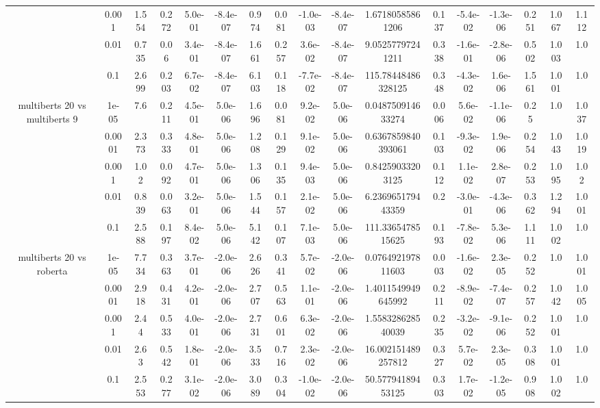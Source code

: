\begin{tabular}{|c|c|c|c|c|c|c|c|c|c|c|c|c|c|c|c|c|}
 & 0.001 & 1.554 & 0.272 & 5.0e-01 & -8.4e-07 & 0.974 & 0.081 & -1.0e-03 & -8.4e-07 & 1.67180585861206 & 0.137 & -5.4e-02 & -1.3e-06 & 0.251 & 1.067 & 1.112 \\
 & 0.01 & 0.735 & 0.06 & 3.4e-01 & -8.4e-07 & 1.661 & 0.257 & 3.6e-02 & -8.4e-07 & 9.05257797241211 & 0.338 & -1.6e-01 & -2.8e-06 & 0.502 & 1.003 & 1.0 \\
 & 0.1 & 2.699 & 0.203 & 6.7e-02 & -8.4e-07 & 6.103 & 0.118 & -7.7e-02 & -8.4e-07 & 115.78448486328125 & 0.348 & -4.3e-02 & 1.6e-06 & 1.561 & 1.001 & 1.0 \\
\hline
\multirow{5}{*}{multiberts 20 vs multiberts 9} & 1e-05 & 7.6 & 0.211 & 4.5e-01 & 5.0e-06 & 1.696 & 0.081 & 9.2e-02 & 5.0e-06 & 0.048750914633274 & 0.006 & 5.6e-02 & -1.1e-06 & 0.25 & 1.0 & 1.037 \\
 & 0.0001 & 2.373 & 0.333 & 4.8e-01 & 5.0e-06 & 1.208 & 0.129 & 9.1e-02 & 5.0e-06 & 0.6367859840393061 & 0.103 & -9.3e-02 & 1.9e-06 & 0.254 & 1.043 & 1.019 \\
 & 0.001 & 1.02 & 0.092 & 4.7e-01 & 5.0e-06 & 1.306 & 0.135 & 9.4e-03 & 5.0e-06 & 0.84259033203125 & 0.112 & 1.1e-02 & 2.8e-07 & 0.253 & 1.095 & 1.02 \\
 & 0.01 & 0.839 & 0.063 & 3.2e-01 & 5.0e-06 & 1.544 & 0.157 & 2.1e-02 & 5.0e-06 & 6.236965179443359 & 0.2 & -3.0e-01 & -4.3e-06 & 0.362 & 1.294 & 1.001 \\
 & 0.1 & 2.588 & 0.197 & 8.4e-02 & 5.0e-06 & 5.142 & 0.107 & 7.1e-03 & 5.0e-06 & 111.3365478515625 & 0.193 & -7.8e-02 & 5.3e-06 & 1.111 & 1.002 & 1.0 \\
\hline
\multirow{5}{*}{multiberts 20 vs roberta } & 1e-05 & 7.734 & 0.363 & 3.7e-01 & -2.0e-06 & 2.626 & 0.341 & 5.7e-02 & -2.0e-06 & 0.076492197811603 & 0.003 & -1.6e-02 & 2.3e-05 & 0.252 & 1.0 & 1.001 \\
 & 0.0001 & 2.918 & 0.431 & 4.2e-01 & -2.0e-06 & 2.707 & 0.563 & 1.1e-01 & -2.0e-06 & 1.4011549949645992 & 0.211 & -8.9e-02 & -7.4e-07 & 0.257 & 1.042 & 1.005 \\
 & 0.001 & 2.44 & 0.533 & 4.0e-01 & -2.0e-06 & 2.731 & 0.601 & 6.3e-02 & -2.0e-06 & 1.558328628540039 & 0.235 & -3.2e-02 & -9.1e-06 & 0.252 & 1.001 & 1.0 \\
 & 0.01 & 2.63 & 0.542 & 1.8e-01 & -2.0e-06 & 3.533 & 0.716 & 2.3e-02 & -2.0e-06 & 16.002151489257812 & 0.327 & 5.7e-02 & 2.3e-05 & 0.308 & 1.001 & 1.0 \\
 & 0.1 & 2.553 & 0.277 & 3.1e-02 & -2.0e-06 & 3.089 & 0.304 & -1.0e-02 & -2.0e-06 & 50.57794189453125 & 0.303 & 1.7e-02 & -1.2e-05 & 0.908 & 1.002 & 1.0 \\

\end{tabular}
